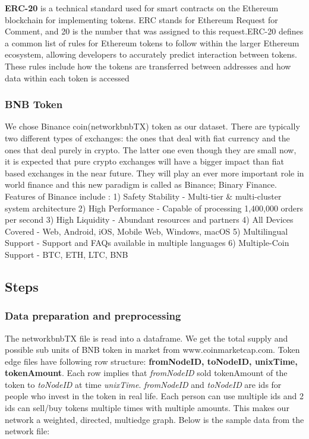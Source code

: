 \documentclass[]{article}
\begin{document}
\textbf{ERC-20} is a technical standard used for smart contracts on the
Ethereum blockchain for implementing tokens. ERC stands for Ethereum
Request for Comment, and 20 is the number that was assigned to this
request.ERC-20 defines a common list of rules for Ethereum tokens to
follow within the larger Ethereum ecosystem, allowing developers to
accurately predict interaction between tokens. These rules include how
the tokens are transferred between addresses and how data within each
token is accessed

\subsubsection{BNB Token}\label{bnb-token}

We chose Binance coin(networkbnbTX) token as our dataset. There are
typically two different types of exchanges: the ones that deal with fiat
currency and the ones that deal purely in crypto. The latter one even
though they are small now, it is expected that pure crypto exchanges
will have a bigger impact than fiat based exchanges in the near future.
They will play an ever more important role in world finance and this new
paradigm is called as Binance; Binary Finance. Features of Binance
include : 1) Safety Stability - Multi-tier \& multi-cluster system
architecture 2) High Performance - Capable of processing 1,400,000
orders per second 3) High Liquidity - Abundant resources and partners 4)
All Devices Covered - Web, Android, iOS, Mobile Web, Windows, macOS 5)
Multilingual Support - Support and FAQs available in multiple languages
6) Multiple-Coin Support - BTC, ETH, LTC, BNB

\subsection{Steps}\label{steps}

\subsubsection{Data preparation and
preprocessing}\label{data-preparation-and-preprocessing}

The networkbnbTX file is read into a dataframe. We get the total supply
and possible sub units of BNB token in market from
www.coinmarketcap.com. Token edge files have following row structure:
\textbf{fromNodeID, toNodeID, unixTime, tokenAmount}. Each row implies
that \emph{fromNodeID} sold tokenAmount of the token to \emph{toNodeID}
at time \emph{unixTime}. \emph{fromNodeID} and \emph{toNodeID} are ids
for people who invest in the token in real life. Each person can use
multiple ids and 2 ids can sell/buy tokens multiple times with multiple
amounts. This makes our network a weighted, directed, multiedge graph.
Below is the sample data from the network file:
\end{document}
